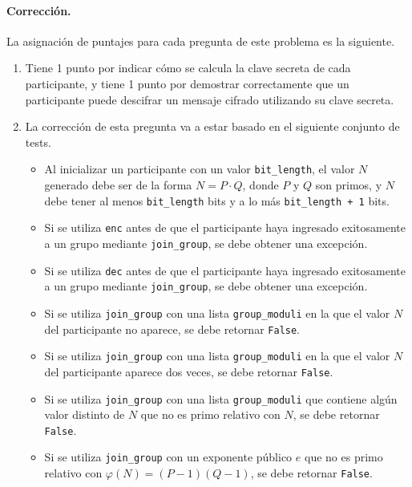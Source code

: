\medskip

\paragraph{Corrección.} La asignación de puntajes para cada pregunta de este problema es la siguiente.
\begin{enumerate}
      \item Tiene 1 punto por indicar cómo se calcula la clave secreta de cada participante, y tiene 1 punto por demostrar correctamente que un participante puede descifrar un mensaje cifrado utilizando su clave secreta.

\item La corrección de esta pregunta va a estar basado en el siguiente conjunto de tests.
\begin{itemize}
\item \text{[0.25 puntos]} Al inicializar un participante con un valor \texttt{bit\_length}, el valor $N$ generado debe ser de la forma $N = P \cdot Q$, donde $P$ y $Q$ son primos, y $N$ debe tener al menos \texttt{bit\_length} bits y a lo más \texttt{bit\_length + 1} bits.

\item \text{[0.25 puntos]} Si se utiliza \texttt{enc} antes de que el participante haya ingresado exitosamente a un grupo mediante \texttt{join\_group}, se debe obtener una excepción.

\item \text{[0.25 puntos]} Si se utiliza \texttt{dec} antes de que el participante haya ingresado exitosamente a un grupo mediante \texttt{join\_group}, se debe obtener una excepción.

\item \text{[0.25 puntos]} Si se utiliza \texttt{join\_group} con una lista \texttt{group\_moduli} en la que el valor $N$ del participante no aparece, se debe retornar \texttt{False}.

\item \text{[0.25 puntos]} Si se utiliza \texttt{join\_group} con una lista \texttt{group\_moduli} en la que el valor $N$ del participante aparece dos veces, se debe retornar \texttt{False}.

\item \text{[0.25 puntos]} Si se utiliza \texttt{join\_group} con una lista \texttt{group\_moduli} que contiene algún valor distinto de $N$ que no es primo relativo con $N$, se debe retornar \texttt{False}.

\item \text{[0.25 puntos]} Si se utiliza \texttt{join\_group} con un exponente público $e$ que no es primo relativo con $\varphi(N) = (P - 1)(Q - 1)$, se debe retornar \texttt{False}.


\end{itemize}
\end{enumerate}
